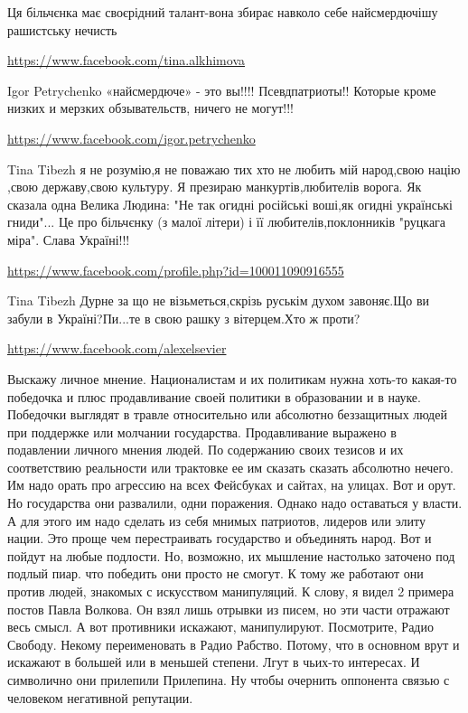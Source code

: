 \documentclass[a4paper,11pt]{extreport}
\begin{document}
\begin{itemize}
Ця більчєнка має своєрідний талант-вона збирає навколо себе найсмердючішу рашистську нечисть

\begin{itemize}
\url{https://www.facebook.com/tina.alkhimova}

Igor Petrychenko «найсмердюче» - это вы!!!! Псевдпатриоты!! Которые кроме низких и мерзких обзывательств, ничего не могут!!!

\url{https://www.facebook.com/igor.petrychenko}

Tina Tibezh я не розумію,я не поважаю тих хто не любить мій народ,свою націю ,свою державу,свою культуру.
Я презираю манкуртів,любителів ворога.
Як сказала одна Велика Людина:
"Не так огидні російські воші,як огидні українські гниди"...
Це про більчєнку (з малої літери) і її любителів,поклонників "руцкага міра".
Слава Україні!!!

\url{https://www.facebook.com/profile.php?id=100011090916555}

Tina Tibezh Дурне за що не візьметься,скрізь руськім духом завоняє.Що ви забули в Україні?Пи...те в свою рашку з вітерцем.Хто ж проти?

\end{itemize}
\url{https://www.facebook.com/alexelsevier}

Выскажу личное мнение. Националистам и их политикам нужна хоть-то какая-то победочка и плюс продавливание своей политики в образовании и в науке. Победочки выглядят в травле относительно или абсолютно беззащитных людей при поддержке или молчании государства. Продавливание выражено в подавлении личного мнения людей. По содержанию своих тезисов и их соответствию реальности или трактовке ее им сказать сказать абсолютно нечего. Им надо орать про агрессию на всех Фейсбуках и сайтах, на улицах. Вот и орут. Но государства они развалили, одни поражения. Однако надо оставаться у власти. А для этого им надо сделать из себя мнимых патриотов, лидеров или элиту нации. Это проще чем перестраивать государство и объединять народ. Вот и пойдут на любые подлости. Но, возможно, их мышление настолько заточено под подлый пиар. что победить они просто не смогут. К тому же работают они против людей, знакомых с искусством манипуляций. К слову, я видел 2 примера постов Павла Волкова. Он взял лишь отрывки из писем, но эти части отражают весь смысл. А вот противники искажают, манипулируют. Посмотрите, Радио Свободу. Некому переименовать в Радио Рабство. Потому, что в основном врут и искажают в большей или в меньшей степени. Лгут в чьих-то интересах. И символично они прилепили Прилепина. Ну чтобы очернить оппонента связью с человеком негативной репутации.


\end{itemize}
\end{document}
